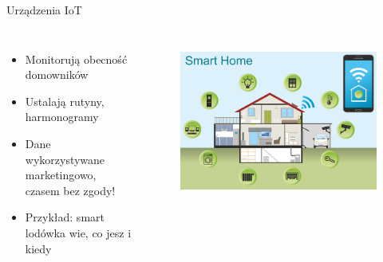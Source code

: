 \begin{frame}{Urządzenia IoT}
\begin{columns}[c]
    \begin{itemize}
        \item Monitorują obecność domowników
        \item Ustalają rutyny, harmonogramy
        \item Dane wykorzystywane marketingowo, czasem bez zgody!
        \item Przykład: smart lodówka wie, co jesz i kiedy
      \end{itemize}
    \centering
    \begin{figure}
        \centering
        \includegraphics[width=1\textwidth]{images/smart-home.png}
        \label{fig:smart-home}
    \end{figure}    
\end{columns}
\end{frame}

